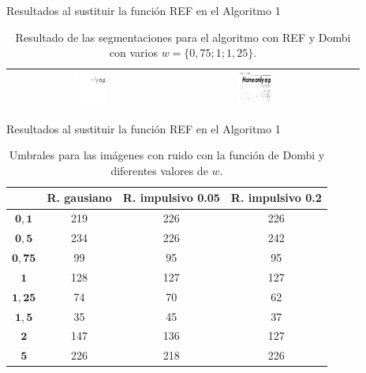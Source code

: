 \documentclass{beamer}
\theoremstyle{plain} %
\theoremstyle{definition}
\newcommand{\bb}{\bfseries}
\begin{document}
\begin{frame}{Resultados al sustituir la función REF en el Algoritmo 1}
\begin{table}
\begin{tabular}{c||c|c|c}
  \includegraphics[width=0.2\textwidth]{img/res/e1a/alg1tipo6d0.75-09.jpg} &
  \includegraphics[width=0.2\textwidth]{img/res/e1a/alg1tipo6d1.25-09.jpg} \\\hline
  \end{tabular}
  \caption{Resultado de las segmentaciones para el algoritmo con REF y Dombi con varios $w = \{0,75; 1; 1,25\}$.\label{tab:resultexp1imagenesdombi}}
  \end{table}
\end{frame}

\begin{frame}{Resultados al sustituir la función REF en el Algoritmo 1}
  \begin{table}
  \centering
  \begin{tabular}{c||c|c|c} 
             &\bb R. gausiano&\bb R. impulsivo 0.05&\bb R. impulsivo 0.2\\\hline\hline
  $\mathbf{0,1}$  &   219   &    226    &     226     \\\hline
  $\mathbf{0,5}$  &   234   &    226    &     242     \\\hline
  $\mathbf{0,75}$ &    99   &     95    &      95     \\\hline
  $\mathbf{1}$    &   128   &    127    &     127     \\\hline
  $\mathbf{1,25}$ &    74   &     70    &      62     \\\hline
  $\mathbf{1,5}$  &    35   &     45    &      37     \\\hline
  $\mathbf{2}$    &   147   &    136    &     127     \\\hline
  $\mathbf{5}$    &   226   &    218    &     226     \\\hline
  \end{tabular}
  \caption{Umbrales para las imágenes con ruido con la función de Dombi y diferentes valores de $w$.\label{tab:resultexp1ruido}}
  \end{table}
\end{frame}
\end{document}
